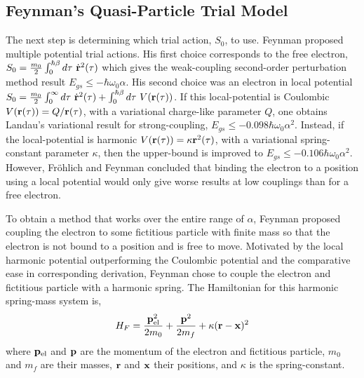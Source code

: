 \subsection{Feynman's Quasi-Particle Trial Model}

The next step is determining which trial action, $S_0$, to use. Feynman proposed multiple potential trial actions. His first choice corresponds to the free electron, $S_0 = \frac{m_0}{2} \int_0^{\hbar\beta} d\tau\ \dot{\vb{r}}^2(\tau)$ which gives the weak-coupling second-order perturbation method result $E_{gs} \leq -\hbar\omega_0\alpha$. His second choice was an electron in local potential $S_0 = \frac{m_0}{2} \int_0^{\infty} d\tau\ \dot{\vb{r}}^2(\tau) + \int_0^{\hbar\beta} d\tau\ V(\vb{r}(\tau))$. If this local-potential is Coulombic $V(\vb{r}(\tau)) = Q/\vb{r}(\tau)$, with a variational charge-like parameter $Q$, one obtains Landau's variational result for strong-coupling, $E_{gs} \leq -0.098 \hbar\omega_0 \alpha^2$. Instead, if the local-potential is harmonic $V(\vb{r}(\tau)) = \kappa \vb{r}^2(\tau)$, with a variational spring-constant parameter $\kappa$, then the upper-bound is improved to $E_{gs} \leq -0.106 \hbar\omega_0 \alpha^2$. However, Fr\"ohlich and Feynman concluded that binding the electron to a position using a local potential would only give worse results at low couplings than for a free electron.

To obtain a method that works over the entire range of $\alpha$, Feynman proposed coupling the electron to some fictitious particle with finite mass so that the electron is not bound to a position and is free to move. Motivated by the local harmonic potential outperforming the Coulombic potential and the comparative ease in corresponding derivation, Feynman chose to couple the electron and fictitious particle with a harmonic spring. The Hamiltonian for this harmonic spring-mass system is,
\begin{equation}
    H_F = \frac{\vb{p}_{\text{el}}^2}{2 m_0} + \frac{\vb{p}^2}{2 m_f} + \kappa (\vb{r} - \vb{x})^2
\end{equation}
where $\vb{p}_{\text{el}}$ and $\vb{p}$ are the momentum of the electron and fictitious particle, $m_0$ and $m_f$ are their masses, $\vb{r}$ and $\vb{x}$ their positions, and $\kappa$ is the spring-constant. 

